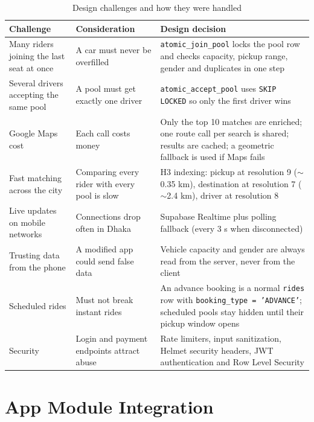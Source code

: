 \begin{table}[H]
  \centering
  \small
  \caption{Design challenges and how they were handled}
  \label{tab:design-challenges}
  \begin{tabularx}{\textwidth}{@{}p{3.2cm}p{3.6cm}L@{}}
    \toprule
    \textbf{Challenge} & \textbf{Consideration} & \textbf{Design decision} \\
    \midrule
    Many riders joining the last seat at once & A car must never be overfilled & \texttt{atomic\_join\_pool} locks the pool row and checks capacity, pickup range, gender and duplicates in one step \\
    Several drivers accepting the same pool & A pool must get exactly one driver & \texttt{atomic\_accept\_pool} uses \texttt{SKIP LOCKED} so only the first driver wins \\
    Google Maps cost & Each call costs money & Only the top 10 matches are enriched; one route call per search is shared; results are cached; a geometric fallback is used if Maps fails \\
    Fast matching across the city & Comparing every rider with every pool is slow & H3 indexing: pickup at resolution 9 ($\sim$0.35 km), destination at resolution 7 ($\sim$2.4 km), driver at resolution 8 \\
    Live updates on mobile networks & Connections drop often in Dhaka & Supabase Realtime plus polling fallback (every 3 s when disconnected) \\
    Trusting data from the phone & A modified app could send false data & Vehicle capacity and gender are always read from the server, never from the client \\
    Scheduled rides & Must not break instant rides & An advance booking is a normal \texttt{rides} row with \texttt{booking\_type = 'ADVANCE'}; scheduled pools stay hidden until their pickup window opens \\
    Security & Login and payment endpoints attract abuse & Rate limiters, input sanitization, Helmet security headers, JWT authentication and Row Level Security \\
    \bottomrule
  \end{tabularx}
\end{table}

\section{App Module Integration}
\label{sec:app-integration}


